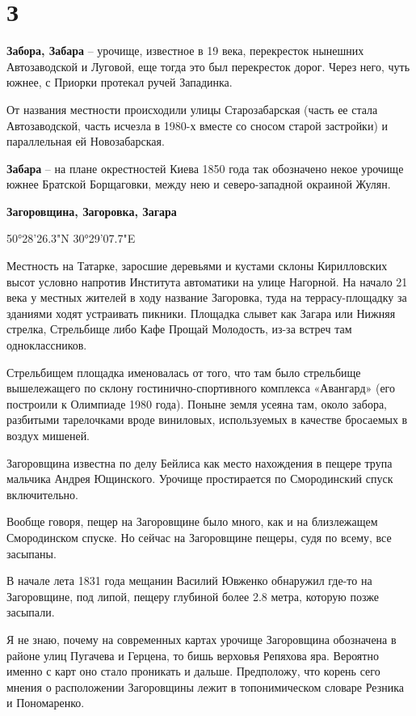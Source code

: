 \chapter*{З}

\textbf{Забора, Забара} – урочище, известное в 19 века, перекресток нынешних Автозаводской и Луговой, еще тогда это был перекресток дорог. Через него, чуть южнее, с Приорки протекал ручей Западинка.

От названия местности происходили улицы Старозабарская (часть ее стала Автозаводской, часть исчезла в 1980-х вместе со сносом старой застройки) и параллельная ей Новозабарская.\\

\medskip

\textbf{Забара} – на плане окрестностей Киева 1850 года так обозначено некое урочище южнее Братской Борщаговки, между нею и северо-западной окраиной Жулян.\\

\medskip

\textbf{Загоровщина, Загоровка, Загара}

50°28'26.3"N 30°29'07.7"E

Местность на Татарке, заросшие деревьями и кустами склоны Кирилловских высот условно напротив Института автоматики на улице Нагорной. На начало 21 века у местных жителей в ходу название Загоровка, туда на террасу-площадку за зданиями ходят устраивать пикники. Площадка слывет как Загара или Нижняя стрелка, Стрельбище либо Кафе Прощай Молодость, из-за встреч там одноклассников.

Стрельбищем площадка именовалась от того, что там было стрельбище вышележащего по склону гостинично-спортивного комплекса «Авангард» (его построили к Олимпиаде 1980 года). Поныне земля усеяна там, около забора, разбитыми тарелочками вроде виниловых, используемых в качестве бросаемых в воздух мишеней.

Загоровщина известна по делу Бейлиса как место нахождения в пещере трупа мальчика Андрея Ющинского. Урочище простирается по Смородинский спуск включительно.

Вообще говоря, пещер на Загоровщине было много, как и на близлежащем Смородинском спуске. Но сейчас на Загоровщине пещеры, судя по всему, все засыпаны.

В начале лета 1831 года мещанин Василий Ювженко обнаружил где-то на Загоровщине, под липой, пещеру глубиной более 2.8 метра, которую позже засыпали. 

Я не знаю, почему на современных картах урочище Загоровщина обозначена в районе улиц Пугачева и Герцена, то бишь верховья Репяхова яра. Вероятно именно с карт оно стало проникать и дальше. Предположу, что корень сего мнения о расположении Загоровщины лежит в топонимическом словаре Резника и Пономаренко.

